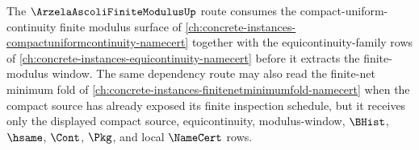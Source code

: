 The $\ArzelaAscoliFiniteModulusUp$ route consumes the compact-uniform-continuity finite modulus surface of \autoref{ch:concrete-instances-compactuniformcontinuity-namecert} together with the equicontinuity-family rows of \autoref{ch:concrete-instances-equicontinuity-namecert} before it extracts the finite-modulus window. The same dependency route may also read the finite-net minimum fold of \autoref{ch:concrete-instances-finitenetminimumfold-namecert} when the compact source has already exposed its finite inspection schedule, but it receives only the displayed compact source, equicontinuity, modulus-window, $\BHist$, $\hsame$, $\Cont$, $\Pkg$, and local $\NameCert$ rows.
